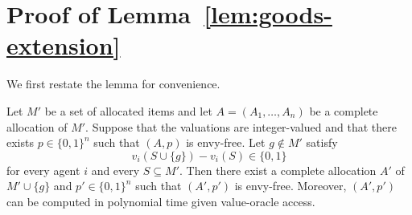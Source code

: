 \section{Proof of \texorpdfstring{Lemma~\ref{lem:goods-extension}}{the one-good extension lemma}}
\label{app:goods-extension}
We first restate the lemma for convenience.
\renewcommand{\restatedname}{Lemma~\ref{lem:goods-extension}}
\begin{restated}
Let $M'$ be a set of allocated items and let $A=(A_1,\ldots,A_n)$ be a complete allocation of $M'$. Suppose that the valuations are integer-valued and that there exists $p\in\{0,1\}^n$ such that $(A,p)$ is envy-free. Let $g\notin M'$ satisfy
\[
v_i(S\cup\{g\})-v_i(S)\in\{0,1\}
\]
for every agent $i$ and every $S\subseteq M'$. Then there exist a complete allocation $A'$ of $M'\cup\{g\}$ and $p'\in\{0,1\}^n$ such that $(A',p')$ is envy-free. Moreover, $(A',p')$ can be computed in polynomial time given value-oracle access.
\end{restated}

